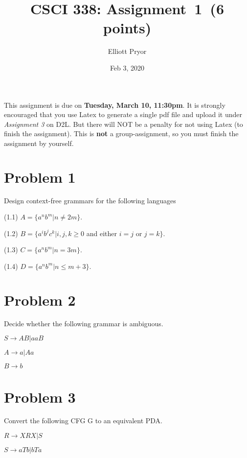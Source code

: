 \documentclass[11pt]{article}
\begin{document}
\date{Feb 3, 2020}
\title{CSCI 338: Assignment~1~(6 points)}

\author{Elliott Pryor}


\maketitle

\noindent
This assignment is due on {\bf Tuesday, March 10, 11:30pm}. It is strongly
encouraged that you use Latex to generate a single pdf file and upload it
under {\em Assignment 3} on D2L. But there will NOT be a penalty for not
using Latex (to finish the assignment). This is {\bf not} a group-assignment,
so you must finish the assignment by yourself.

\section*{Problem 1}

\noindent
Design context-free grammars for the following languages

(1.1) $A=\{a^nb^m|n\neq 2m\}$.

(1.2) $B=\{a^ib^jc^k|i,j,k\geq 0$ and either $i=j$ or $j=k\}$.

(1.3) $C=\{a^nb^m|n=3m\}$.

(1.4) $D=\{a^nb^m|n\leq m+3\}$.
\newline

\section*{Problem 2}

\noindent
Decide whether the following grammar is ambiguous.
\newline

$S\rightarrow AB|aaB$

$A\rightarrow a|Aa$

$B\rightarrow b$
\newpage

\section*{Problem 3}

\noindent
Convert the following CFG G to an equivalent PDA.

$R\rightarrow XRX|S$

$S\rightarrow aTb|bTa$
\end{document}
